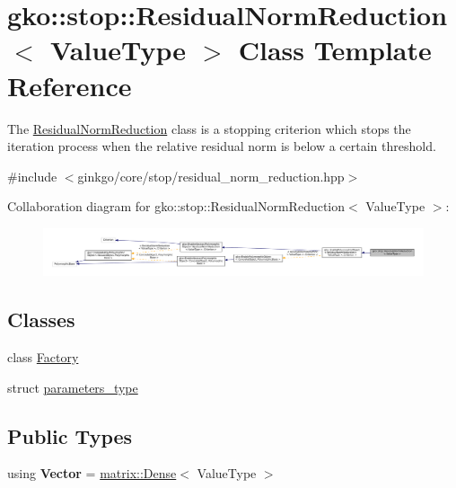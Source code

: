 \hypertarget{classgko_1_1stop_1_1ResidualNormReduction}{}\section{gko\+:\+:stop\+:\+:Residual\+Norm\+Reduction$<$ Value\+Type $>$ Class Template Reference}
\label{classgko_1_1stop_1_1ResidualNormReduction}


The \hyperlink{classgko_1_1stop_1_1ResidualNormReduction}{Residual\+Norm\+Reduction} class is a stopping criterion which stops the iteration process when the relative residual norm is below a certain threshold.  




{\ttfamily \#include $<$ginkgo/core/stop/residual\+\_\+norm\+\_\+reduction.\+hpp$>$}



Collaboration diagram for gko\+:\+:stop\+:\+:Residual\+Norm\+Reduction$<$ Value\+Type $>$\+:
\nopagebreak
\begin{figure}[H]
\begin{center}
\leavevmode
\includegraphics[width=350pt]{classgko_1_1stop_1_1ResidualNormReduction__coll__graph}
\end{center}
\end{figure}
\subsection*{Classes}
\begin{DoxyCompactItemize}
\item 
class \hyperlink{classgko_1_1stop_1_1ResidualNormReduction_1_1Factory}{Factory}
\item 
struct \hyperlink{structgko_1_1stop_1_1ResidualNormReduction_1_1parameters__type}{parameters\+\_\+type}
\end{DoxyCompactItemize}
\subsection*{Public Types}
\begin{DoxyCompactItemize}
\item 
\mbox{\label{classgko_1_1stop_1_1ResidualNormReduction_a3be024dedb5a5b7f62ed9370e098b4c4}} 
using {\bfseries Vector} = \hyperlink{classgko_1_1matrix_1_1Dense}{matrix\+::\+Dense}$<$ Value\+Type $>$
\end{DoxyCompactItemize}
